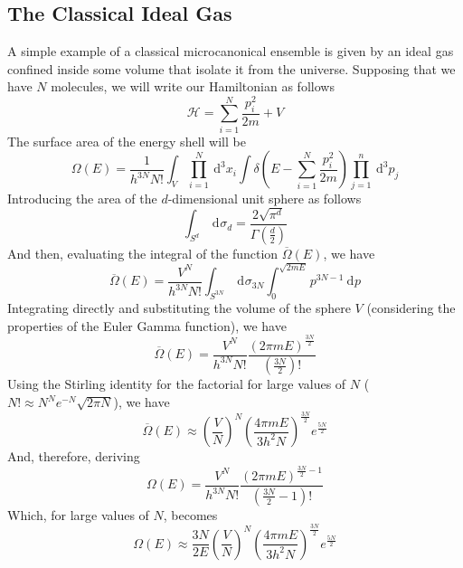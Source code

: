 \documentclass[a4paper, 11pt]{book}
\newcommand{\1}{\opr{\mathds{1}}}
\newcommand{\diff}[2][]{\ \mathrm{d}^{#1}#2}
\newcommand{\cc}[1]{\overline{#1}}
\theoremstyle{plain}
\begin{document}
		\subsection{The Classical Ideal Gas}
		A simple example of a classical microcanonical ensemble is given by an ideal gas confined inside some volume that isolate it from the universe. Supposing that we have $N$ molecules, we will write our Hamiltonian as follows
		\begin{equation}
			\mathcal{H}=\sum_{i=1}^N\frac{p_i^2}{2m}+V
			\label{eq:classicalgas}
		\end{equation}
		The surface area of the energy shell will be
		\begin{equation}
			\Omega(E)=\frac{1}{h^{3N}N!}\int_{V}\prod_{i=1}^N\diff[3]{x_i}\int\delta\left( E-\sum_{i=1}^N\frac{p_i^2}{2m} \right)\prod_{j=1}^n\diff[3]{p_j}
			\label{eq:OmegaEclassicalidealgas}
		\end{equation}
		Introducing the area of the $d$-dimensional unit sphere as follows
		\begin{equation*}
			\int_{S^d}\diff{\sigma_d}=\frac{2\sqrt{\pi^d}}{\Gamma\left( \frac{d}{2} \right)}
		\end{equation*}
		And then, evaluating the integral of the function $\cc{\Omega}(E)$, we have
		\begin{equation}
			\cc{\Omega}(E)=\frac{V^N}{h^{3N}N!}\int_{S^{3N}}\diff{\sigma_{3N}}\int_{0}^{\sqrt{2mE}}p^{3N-1}\diff{p}
			\label{eq:omegabarE}
		\end{equation}
		Integrating directly and substituting the volume of the sphere $V$ (considering the properties of the Euler Gamma function), we have
		\begin{equation}
			\cc{\Omega}(E)=\frac{V^N}{h^{3N}N!}\frac{\left( 2\pi mE \right)^{\frac{3N}{2}}}{\left( \frac{3N}{2} \right)!}
			\label{eq:omegabaridealgas}
		\end{equation}
		Using the Stirling identity for the factorial for large values of $N$ ($N!\approx N^Ne^{-N}\sqrt{2\pi N}$), we have
		\begin{equation}
			\cc{\Omega}(E)\approx\left( \frac{V}{N} \right)^N\left( \frac{4\pi mE}{3h^2N} \right)^{\frac{3N}{2}}e^{\frac{5N}{2}}
			\label{eq:ccomegaebaridealgas}
		\end{equation}
		And, therefore, deriving
		\begin{equation}
			\Omega(E)=\frac{V^N}{h^{3N}N!}\frac{\left( 2\pi mE \right)^{\frac{3N}{2}-1}}{\left( \frac{3N}{2}-1 \right)!}
			\label{eq:OmegaEclassicalgascomplete}
		\end{equation}
		Which, for large values of $N$, becomes
		\begin{equation}
			\Omega(E)\approx\frac{3N}{2E}\left( \frac{V}{N} \right)^N\left( \frac{4\pi mE}{3h^2N} \right)^{\frac{3N}{2}}e^{\frac{5N}{2}}
			\label{eq:OmegaEclassicalgaslargeN}
		\end{equation}
\end{document}
